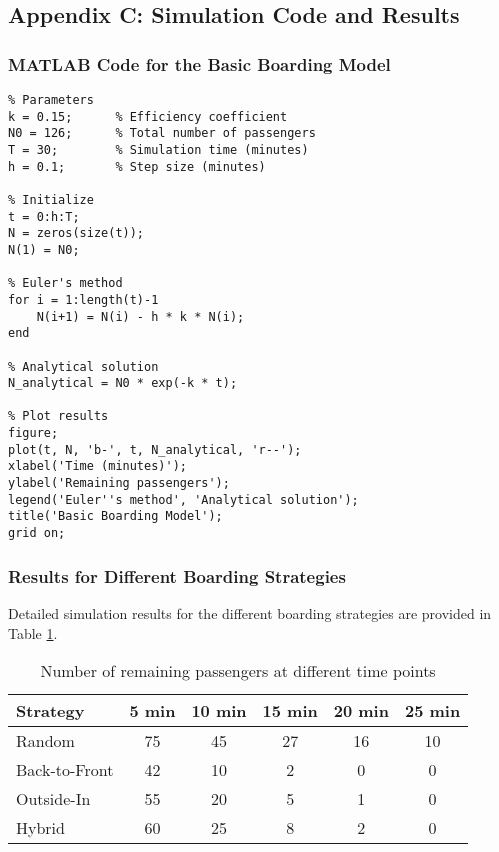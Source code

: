 \subsection{Appendix C: Simulation Code and Results}

\subsubsection{MATLAB Code for the Basic Boarding Model}

\begin{verbatim}
% Parameters
k = 0.15;      % Efficiency coefficient
N0 = 126;      % Total number of passengers
T = 30;        % Simulation time (minutes)
h = 0.1;       % Step size (minutes)

% Initialize
t = 0:h:T;
N = zeros(size(t));
N(1) = N0;

% Euler's method
for i = 1:length(t)-1
    N(i+1) = N(i) - h * k * N(i);
end

% Analytical solution
N_analytical = N0 * exp(-k * t);

% Plot results
figure;
plot(t, N, 'b-', t, N_analytical, 'r--');
xlabel('Time (minutes)');
ylabel('Remaining passengers');
legend('Euler''s method', 'Analytical solution');
title('Basic Boarding Model');
grid on;
\end{verbatim}

\subsubsection{Results for Different Boarding Strategies}

Detailed simulation results for the different boarding strategies are provided in Table \ref{tab:detailed_results}.

\begin{table}[H]
\centering
\begin{tabular}{|l|c|c|c|c|c|}
\hline
\textbf{Strategy} & \textbf{5 min} & \textbf{10 min} & \textbf{15 min} & \textbf{20 min} & \textbf{25 min} \\ \hline
Random & 75 & 45 & 27 & 16 & 10 \\ \hline
Back-to-Front & 42 & 10 & 2 & 0 & 0 \\ \hline
Outside-In & 55 & 20 & 5 & 1 & 0 \\ \hline
Hybrid & 60 & 25 & 8 & 2 & 0 \\ \hline
\end{tabular}
\caption{Number of remaining passengers at different time points}
\label{tab:detailed_results}
\end{table}

